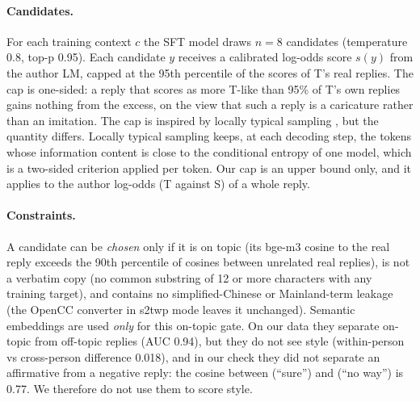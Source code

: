\paragraph{Candidates.}
For each training context $c$ the SFT model draws $n = 8$ candidates (temperature 0.8, top-p 0.95).
Each candidate $y$ receives a calibrated log-odds score $s(y)$ from the author LM, capped at the 95th percentile of the scores of T's real replies.
The cap is one-sided: a reply that scores as more T-like than 95\% of T's own replies gains nothing from the excess, on the view that such a reply is a caricature rather than an imitation.
The cap is inspired by locally typical sampling \citep{meister2023locally}, but the quantity differs.
Locally typical sampling keeps, at each decoding step, the tokens whose information content is close to the conditional entropy of one model, which is a two-sided criterion applied per token.
Our cap is an upper bound only, and it applies to the author log-odds (T against S) of a whole reply.

\paragraph{Constraints.}
A candidate can be \emph{chosen} only if it is on topic (its bge-m3 cosine to the real reply exceeds the 90th percentile of cosines between unrelated real replies), is not a verbatim copy (no common substring of 12 or more characters with any training target), and contains no simplified-Chinese or Mainland-term leakage (the OpenCC converter  in s2twp mode leaves it unchanged).
Semantic embeddings are used \emph{only} for this on-topic gate.
On our data they separate on-topic from off-topic replies (AUC 0.94), but they do not see style (within-person vs cross-person difference 0.018), and in our check they did not separate an affirmative from a negative reply: the cosine between  (``sure'') and  (``no way'') is 0.77.
We therefore do not use them to score style.

